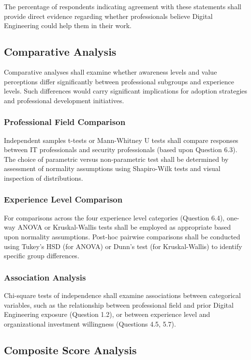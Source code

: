 The percentage of respondents indicating agreement with these statements shall provide direct evidence regarding whether professionals believe Digital Engineering could help them in their work.

\subsection{Comparative Analysis}

Comparative analyses shall examine whether awareness levels and value perceptions differ significantly between professional subgroups and experience levels. Such differences would carry significant implications for adoption strategies and professional development initiatives.

\subsubsection{Professional Field Comparison}

Independent samples t-tests or Mann-Whitney U tests shall compare responses between IT professionals and security professionals (based upon Question 6.3). The choice of parametric versus non-parametric test shall be determined by assessment of normality assumptions using Shapiro-Wilk tests and visual inspection of distributions.

\subsubsection{Experience Level Comparison}

For comparisons across the four experience level categories (Question 6.4), one-way ANOVA or Kruskal-Wallis tests shall be employed as appropriate based upon normality assumptions. Post-hoc pairwise comparisons shall be conducted using Tukey's HSD (for ANOVA) or Dunn's test (for Kruskal-Wallis) to identify specific group differences.

\subsubsection{Association Analysis}

Chi-square tests of independence shall examine associations between categorical variables, such as the relationship between professional field and prior Digital Engineering exposure (Question 1.2), or between experience level and organizational investment willingness (Questions 4.5, 5.7).

\subsection{Composite Score Analysis}


